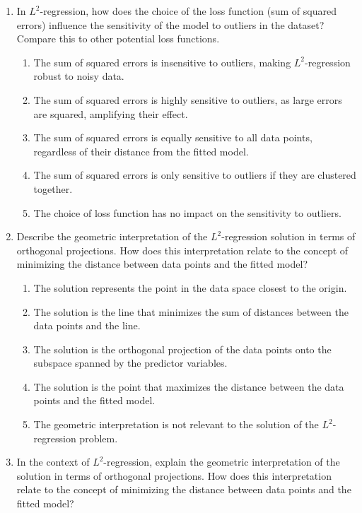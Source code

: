 \documentclass{article}%
\begin{document}
\begin{enumerate}
\begin{enumerate}
\end{enumerate}%
\vspace{1em}%
\item In $L^2$-regression, how does the choice of the loss function (sum of squared errors) influence the sensitivity of the model to outliers in the dataset?  Compare this to other potential loss functions.%
\begin{enumerate}%
\item The sum of squared errors is insensitive to outliers, making $L^2$-regression robust to noisy data.%
\item The sum of squared errors is highly sensitive to outliers, as large errors are squared, amplifying their effect.%
\item The sum of squared errors is equally sensitive to all data points, regardless of their distance from the fitted model.%
\item The sum of squared errors is only sensitive to outliers if they are clustered together.%
\item The choice of loss function has no impact on the sensitivity to outliers.%
\end{enumerate}%
\vspace{1em}%
\item Describe the geometric interpretation of the $L^2$-regression solution in terms of orthogonal projections. How does this interpretation relate to the concept of minimizing the distance between data points and the fitted model?%
\begin{enumerate}%
\item The solution represents the point in the data space closest to the origin.%
\item The solution is the line that minimizes the sum of distances between the data points and the line.%
\item The solution is the orthogonal projection of the data points onto the subspace spanned by the predictor variables.%
\item The solution is the point that maximizes the distance between the data points and the fitted model.%
\item The geometric interpretation is not relevant to the solution of the $L^2$-regression problem.%
\end{enumerate}%
\vspace{1em}%
\item In the context of $L^2$-regression, explain the geometric interpretation of the solution in terms of orthogonal projections. How does this interpretation relate to the concept of minimizing the distance between data points and the fitted model?%

\end{enumerate}
\end{document}
